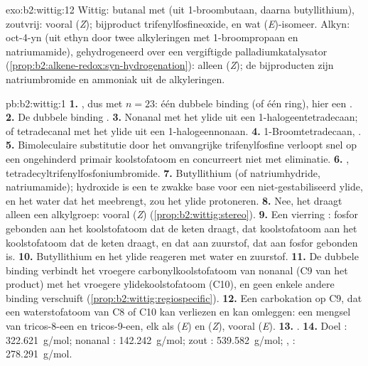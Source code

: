 \begin{solution}{exo:b2:wittig:12}
Wittig: butanal met  (uit 1-broombutaan, daarna butyllithium), zoutvrij:
vooral (\textit{Z}); bijproduct trifenylfosfineoxide, en wat (\textit{E})-isomeer. Alkyn:
oct-4-yn (uit ethyn door twee alkyleringen met 1-broompropaan en natriumamide), gehydrogeneerd over een
vergiftigde palladiumkatalysator (\cref{prop:b2:alkene-redox:syn-hydrogenation}): alleen (\textit{Z}); de
bijproducten zijn natriumbromide en ammoniak uit de alkyleringen.
\end{solution}

\begin{solution}{pb:b2:wittig:1}
\textbf{1.} , dus  met $n = 23$: één dubbele binding (of één ring), hier een
.
\textbf{2.} De dubbele binding .
\textbf{3.} Nonanal  met het ylide uit een 1-halogeentetradecaan; of tetradecanal
 met het ylide uit een 1-halogeennonaan.
\textbf{4.} 1-Broomtetradecaan, .
\textbf{5.} Bimoleculaire substitutie door het omvangrijke trifenylfosfine verloopt snel op een ongehinderd primair
koolstofatoom en concurreert niet met eliminatie.
\textbf{6.} , tetradecyltrifenylfosfoniumbromide.
\textbf{7.} Butyllithium (of natriumhydride, natriumamide); hydroxide is een te zwakke base voor een
niet-gestabiliseerd ylide, en het water dat het meebrengt, zou het ylide protoneren.
\textbf{8.} Nee, het draagt alleen een alkylgroep: vooral (\textit{Z}) (\cref{prop:b2:wittig:stereo}).
\textbf{9.} Een vierring : fosfor gebonden aan het koolstofatoom dat de keten  draagt,
dat koolstofatoom aan het koolstofatoom dat de keten  draagt, en dat aan zuurstof, dat aan fosfor
gebonden is.
\textbf{10.} Butyllithium en het ylide reageren met water en zuurstof.
\textbf{11.} De dubbele binding verbindt het vroegere carbonylkoolstofatoom van nonanal (C9 van het product) met het
vroegere ylidekoolstofatoom (C10), en geen enkele andere binding verschuift (\cref{prop:b2:wittig:regiospecific}).
\textbf{12.} Een carbokation op C9, dat een waterstofatoom van C8 of C10 kan verliezen en kan omleggen: een mengsel van
tricos-8-een en tricos-9-een, elk als (\textit{E}) en (\textit{Z}), vooral (\textit{E}).
\textbf{13.} .
\textbf{14.} Doel : \qty{322.621}{g/mol}; nonanal : \qty{142.242}{g/mol}; zout
: \qty{539.582}{g/mol}; , : \qty{278.291}{g/mol}.

\end{solution}

